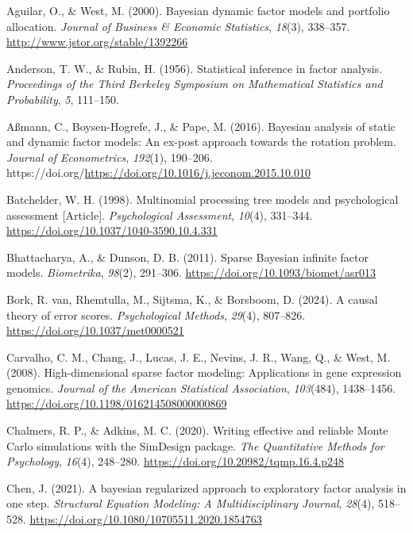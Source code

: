 \documentclass[
  man,
  longtable,
  nolmodern,
  notxfonts,
  notimes,
  colorlinks=true,linkcolor=blue,citecolor=blue,urlcolor=blue]{apa7}
\newlength{\cslhangindent}
\newenvironment{CSLReferences}[2] %
 {\begin{list}{}{%
  \setlength{\itemindent}{0pt}
  \setlength{\leftmargin}{0pt}
  \setlength{\parsep}{0pt}
  \ifodd #1
   \setlength{\leftmargin}{\cslhangindent}
   \setlength{\itemindent}{-1\cslhangindent}
  \fi
  \setlength{\itemsep}{#2\baselineskip}}}
 {\end{list}}
\theoremstyle{plain}
\theoremstyle{plain}
\theoremstyle{remark}
\begin{document}
\label{refs}
\begin{CSLReferences}{1}{0}
Aguilar, O., \& West, M. (2000). Bayesian dynamic factor models and
portfolio allocation. \emph{Journal of Business \& Economic Statistics},
\emph{18}(3), 338--357. \url{http://www.jstor.org/stable/1392266}

Anderson, T. W., \& Rubin, H. (1956). Statistical inference in factor
analysis. \emph{Proceedings of the Third Berkeley Symposium on
Mathematical Statistics and Probability}, \emph{5}, 111--150.

Aßmann, C., Boysen-Hogrefe, J., \& Pape, M. (2016). Bayesian analysis of
static and dynamic factor models: An ex-post approach towards the
rotation problem. \emph{Journal of Econometrics}, \emph{192}(1),
190--206.
https://doi.org/\url{https://doi.org/10.1016/j.jeconom.2015.10.010}

Batchelder, W. H. (1998). Multinomial processing tree models and
psychological assessment {[}Article{]}. \emph{Psychological Assessment},
\emph{10}(4), 331--344. \url{https://doi.org/10.1037/1040-3590.10.4.331}

Bhattacharya, A., \& Dunson, D. B. (2011). Sparse {Bayesian} infinite
factor models. \emph{Biometrika}, \emph{98}(2), 291--306.
\url{https://doi.org/10.1093/biomet/asr013}

Bork, R. van, Rhemtulla, M., Sijtsma, K., \& Borsboom, D. (2024). A
causal theory of error scores. \emph{Psychological Methods},
\emph{29}(4), 807--826. \url{https://doi.org/10.1037/met0000521}

Carvalho, C. M., Chang, J., Lucas, J. E., Nevins, J. R., Wang, Q., \&
West, M. (2008). High-dimensional sparse factor modeling: Applications
in gene expression genomics. \emph{Journal of the American Statistical
Association}, \emph{103}(484), 1438--1456.
\url{https://doi.org/10.1198/016214508000000869}

Chalmers, R. P., \& Adkins, M. C. (2020). Writing effective and reliable
{Monte Carlo} simulations with the {SimDesign} package. \emph{The
Quantitative Methods for Psychology}, \emph{16}(4), 248--280.
\url{https://doi.org/10.20982/tqmp.16.4.p248}

Chen, J. (2021). A bayesian regularized approach to exploratory factor
analysis in one step. \emph{Structural Equation Modeling: A
Multidisciplinary Journal}, \emph{28}(4), 518--528.
\url{https://doi.org/10.1080/10705511.2020.1854763}


\end{CSLReferences}
\end{document}
